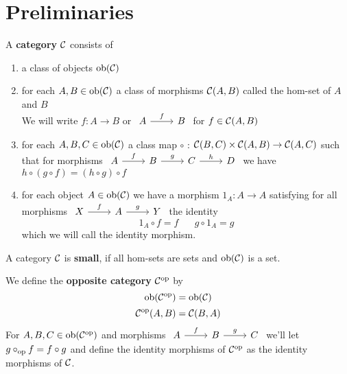 \chapter{Preliminaries}
\begin{definition}
    A \textbf{category} $\mathcal{C}$ consists of
    \begin{enumerate}
        \item a class of objects $\text{ob}(\mathcal{C})$
        \item for each $A,B\in\text{ob}(\mathcal{C})$ a class of morphisms $\mathcal{C}(A,B)$ called the hom-set of $A$ and $B$\\
        We will write $f : A\to B$ or
$\begin{tikzcd}
A & B
\arrow["f", from=1-1, to=1-2]
\end{tikzcd}$ for $f\in\mathcal{C}(A,B)$
        \item for each $A,B,C\in\text{ob}(\mathcal{C})$ a class map $\circ$ : $\mathcal{C}(B,C)\times\mathcal{C}(A,B)\to \mathcal{C}(A,C)$ such that
    for morphisms $\begin{tikzcd}
        A & B & C & D
        \arrow["f", from=1-1, to=1-2]
        \arrow["g", from=1-2, to=1-3]
        \arrow["h", from=1-3, to=1-4]
    \end{tikzcd}$ we have $h\circ(g\circ f) = (h\circ g)\circ f$
        \item for each object $A\in\text{ob}(\mathcal{C})$ we have a morphism $1_A : A\to A$ satisfying
         for all morphisms $\begin{tikzcd}
            X & A & Y
            \arrow["f", from=1-1, to=1-2]
            \arrow["g", from=1-2, to=1-3]
        \end{tikzcd}$ the identity
        \[1_A \circ f = f \hspace{20pt} g \circ 1_A = g \]
        which we will call the identity morphism. 
    \end{enumerate}
    A category $\mathcal{C}$ is \textbf{small}, if all hom-sets are sets and $\text{ob}(\mathcal{C})$ is a set. \par
    We define the \textbf{opposite category} $\mathcal{C}^{\text{op}}$ by
    \[\text{ob}(\mathcal{C}^{\text{op}}) = \text{ob}(\mathcal{C})\]
    \[\mathcal{C}^{\text{op}}(A,B) = \mathcal{C}(B,A)\]
    For $A,B,C\in\text{ob}(\mathcal{C}^{\text{op}})$ and morphisms $\begin{tikzcd}
	A & B & C
	\arrow["f", from=1-1, to=1-2]
	\arrow["g", from=1-2, to=1-3]
\end{tikzcd}$ we'll let $g\circ_{\text{op}} f = f\circ g$ and define the identity morphisms of $\mathcal{C}^{\text{op}}$ as the identity morphisms of $\mathcal{C}$.
\end{definition}
